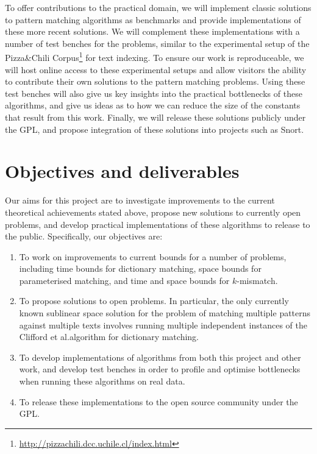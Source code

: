 \documentclass[a4paper,11pt]{article}
\begin{document}
    To offer contributions to the practical domain, we will implement classic solutions to pattern matching algorithms as benchmarks and provide implementations of these more recent solutions. We will complement these implementations with a number of test benches for the problems, similar to the experimental setup of the Pizza\&Chili Corpus\footnote{\url{http://pizzachili.dcc.uchile.cl/index.html}} for text indexing. To ensure our work is reproduceable, we will host online access to these experimental setups and allow visitors the ability to contribute their own solutions to the pattern matching problems. Using these test benches will also give us key insights into the practical bottlenecks of these algorithms, and give us ideas as to how we can reduce the size of the constants that result from this work. Finally, we will release these solutions publicly under the GPL, and propose integration of these solutions into projects such as Snort.

    \section{Objectives and deliverables}

    Our aims for this project are to investigate improvements to the current theoretical achievements stated above, propose new solutions to currently open problems, and develop practical implementations of these algorithms to release to the public. Specifically, our objectives are:

    \begin{enumerate}
        \item To work on improvements to current bounds for a number of problems, including time bounds for dictionary matching, space bounds for parameterised matching, and time and space bounds for $k$-mismatch.
        \item To propose solutions to open problems. In particular, the only currently known sublinear space solution for the problem of matching multiple patterns against multiple texts involves running multiple independent instances of the Clifford et al.\@ algorithm for dictionary matching.
        \item To develop implementations of algorithms from both this project and other work, and develop test benches in order to profile and optimise bottlenecks when running these algorithms on real data.
        \item To release these implementations to the open source community under the GPL.
    \end{enumerate}
\end{document}
